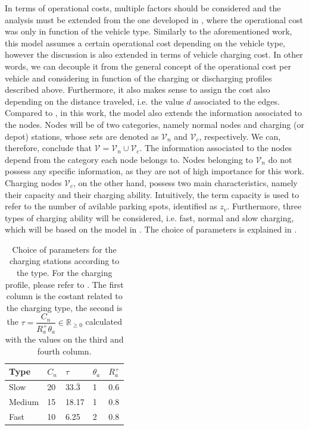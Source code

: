 In terms of operational costs, multiple factors should be considered and the analysis must be extended from the one developed in \cite{project_thesis}, where the operational cost was only in function of the vehicle type. Similarly to the aforementioned work, this model assumes a certain operational cost depending on the vehicle type, however the discussion is also extended in terms of vehicle charging cost. In other words, we can decouple it from the general concept of the operational cost per vehicle and considering in function of the charging or discharging profiles described above. Furthermore, it also makes sense to assign the cost also depending on the distance traveled, i.e. the value $d$ associated to the edges. \\
Compared to \cite{project_thesis}, in this work, the model also extends the information associated to the nodes. Nodes will be of two categories, namely normal nodes and charging (or depot) stations, whose sets are denoted as $\mathcal{V}_n$ and $\mathcal{V}_c$, respectively. We can, therefore, conclude that $\mathcal{V} = \mathcal{V}_n \cup \mathcal{V}_c$. The information associated to the nodes depend from the category each node belongs to. Nodes belonging to $\mathcal{V}_n$ do not possess any specific information, as they are not of high importance for this work. Charging nodes $\mathcal{V}_c$, on the other hand, possess two main characteristics, namely their capacity and their charging ability. Intuitively, the term capacity is used to refer to the number of avilable parking spots, identified as $z_v$. Furthermore, three types of charging ability will be considered, i.e. fast, normal and slow charging, which will be based on the model in . The choice of parameters is explained in . 
\begin{table}[th]
	\centering
\begin{tabular}{ |p{2cm}|p{1cm}|p{1cm}|p{1cm}|p{1cm}|}
	\hline
	Type&$C_n$  &$\tau$&$\theta_a$&$R^+_a$ \\
	\hline
	Slow & 20 &$33.\bar{3}$&1&0.6  \\
	Medium &15 &18.17& 1   & 0.8\\
	Fast & 10 & 6.25&2& 0.8\\
	\hline
\end{tabular}
	\caption[Parameters choice for the Chargin Stations]{Choice of parameters for the charging stations according to the type. For the charging profile, please refer to . The first column is the costant related to the charging type, the second is the $\tau= \dfrac{C_n}{R^+_a\theta_a}\in \mathbb{R}_{\ge0}$ calculated with the values on the third and fourth column. }
	\label{tab:charging_stations}	
\end{table}\\

